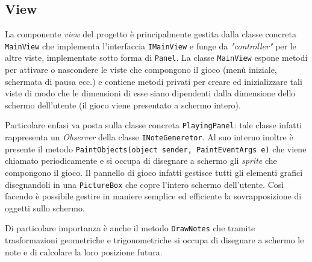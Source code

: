 \newpage
\subsection{View}
\begin{figure}[h!]
\end{figure}
La componente \emph{view} del progetto è principalmente gestita dalla classe concreta \texttt{MainView} che implementa l'interfaccia \texttt{IMainView} e funge da \emph{"controller"} per le altre viste, implementate sotto forma di \texttt{Panel}.
La classe \texttt{MainView} espone metodi per attivare o nascondere le viste che compongono il gioco (menù iniziale, schermata di pausa ecc.) e contiene metodi privati per creare ed inizializzare tali viste di modo che le dimensioni di esse siano dipendenti dalla dimensione dello schermo dell'utente (il gioco viene presentato a schermo intero).

\vspace{0.5cm}
Particolare enfasi va posta sulla classe concreta \texttt{PlayingPanel}: tale classe infatti rappresenta un \emph{Observer} della classe \texttt{INoteGeneretor}.
Al suo interno inoltre è presente il metodo \texttt{PaintObjects(object sender, PaintEventArgs e)} che viene chiamato periodicamente e si occupa di disegnare a schermo gli \emph{sprite} che compongono il gioco.
Il pannello di gioco infatti gestisce tutti gli elementi grafici disegnandoli in una \texttt{PictureBox} che copre l'intero schermo dell'utente. Così facendo è possibile gestire in maniere semplice ed efficiente la sovrapposizione di oggetti sullo schermo.

Di particolare importanza è anche il metodo \texttt{DrawNotes} che tramite trasformazioni geometriche e trigonometriche si occupa di disegnare a schermo le note e di calcolare la loro posizione futura.